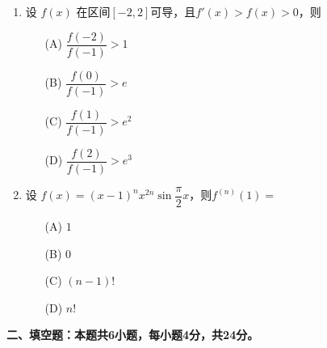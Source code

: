\documentclass[a4paper,12pt]{article}
\newif\iffirstpage
\begin{document}
\begin{enumerate}
    \item 设 \( f(x) \) 在区间$[-2,2]$可导，且\( f'(x) > f(x) > 0 \)，则 
    \begin{multicols}{4}
        \begin{itemize}
            \item[(A)] $\dfrac{f(-2)}{f(-1)} > 1 $
            \item[(B)] $\dfrac{f(0)}{f(-1)} > e $
            \item[(C)] $\dfrac{f(1)}{f(-1)} > e^2 $
            \item[(D)] $\dfrac{f(2)}{f(-1)} > e^3 $
        \end{itemize}
    \end{multicols}

    \item 设 $f(x)=(x-1)^n x^{2n} \sin{\dfrac{\pi}{2}x}$，则$f^{(n)}(1)=$
    \begin{multicols}{4}
        \begin{itemize}
            \item[(A)] $ 1 $
            \item[(B)] $ 0 $
            \item[(C)] $ (n-1)! $
            \item[(D)] $ n! $
        \end{itemize}
    \end{multicols}


\end{enumerate}



\newpage

\firstpagefalse %



\noindent
\textbf{二、填空题：本题共6小题，每小题4分，共24分。}
\end{document}
